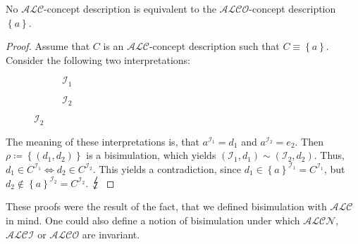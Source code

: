\begin{prop}
	No $\mathcal{ALC}$-concept description is equivalent to the $\mathcal{ALCO}$-concept description $\left\{ a \right\}$.
\end{prop}
\begin{proof}
	Assume that $C$ is an $\mathcal{ALC}$-concept description such that $C \equiv \left\{ a \right\}$.
	Consider the following two interpretations:
	\begin{figure}[H]
		\centering
		\begin{subfigure}[t]{.475\textwidth}
			\centering
			\caption{$\mathcal{I}_1$}
		\end{subfigure}
		\hfill
		\begin{subfigure}[t]{.475\textwidth}
			\centering
			\caption{$\mathcal{I}_2$}
	\end{subfigure}
	\end{figure}
	The meaning of these interpretations is, that $a^{\mathcal{I}_1} = d_1$ and $a^{\mathcal{I}_2} = e_2$.
	Then $\rho \coloneqq \left\{ (d_1,d_2) \right\}$ is a bisimulation, which yields $\left( \mathcal{I}_1, d_1 \right) \sim \left( \mathcal{I}_2, d_2 \right)$.
	Thus, $d_1 \in C^{\mathcal{I}_1} \iff d_2 \in C^{\mathcal{I}_2}$.
	This yields a contradiction, since $d_1 \in \left\{ a \right\}^{\mathcal{I}_1} = C^{\mathcal{I}_1}$, but
	 $d_2 \notin \left\{ a \right\}^{\mathcal{I}_2} = C^{\mathcal{I}_2}$. $\contra$
\end{proof}
These proofs were the result of the fact, that we defined bisimulation with $\mathcal{ALC}$ in mind.
One could also define a notion of bisimulation under which $\mathcal{ALCN}$, $\mathcal{ALCI}$ or $\mathcal{ALCO}$ are invariant.

\newpage
